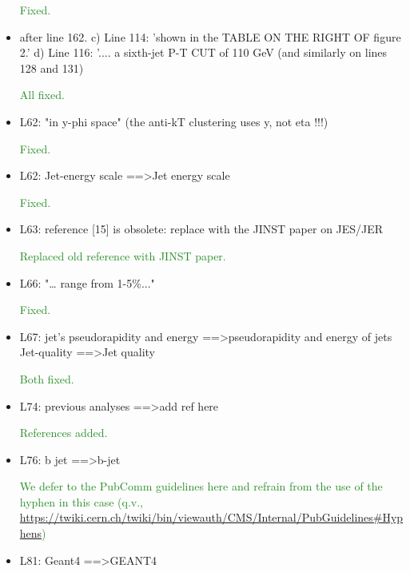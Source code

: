\documentclass[paper=a4, fontsize=11pt]{scrartcl}
\begin{document}
\begin{itemize}
\textcolor{ForestGreen}{Fixed.}\\


\item after line 162. 
c) Line 114: 'shown in the TABLE ON THE RIGHT OF figure 2.' 
d) Line 116: '.... a sixth-jet P-T CUT of 110 GeV 
(and similarly on lines 128 and 131) 

\textcolor{ForestGreen}{All fixed.}\\


\item L62: 
"in y-phi space" (the anti-kT clustering uses y, not eta !!!) 

\textcolor{ForestGreen}{Fixed.}\\


\item L62: 
Jet-energy scale ==\textgreater Jet energy scale 

\textcolor{ForestGreen}{Fixed.}\\


\item L63: 
reference [15] is obsolete: replace with the JINST paper on JES/JER 

\textcolor{ForestGreen}{Replaced old reference with JINST paper.}\\


\item L66: 
"… range from 1-5\%..." 

\textcolor{ForestGreen}{Fixed.}\\


\item L67: 
jet’s pseudorapidity and energy ==\textgreater pseudorapidity and energy of jets 
Jet-quality ==\textgreater Jet quality 

\textcolor{ForestGreen}{Both fixed.}\\


\item L74: 
previous analyses ==\textgreater add ref here 

\textcolor{ForestGreen}{References added.}\\


\item L76: 
b jet ==\textgreater b-jet 

\textcolor{ForestGreen}{We defer to the PubComm guidelines here and refrain from the use of the hyphen
in this case (q.v., \url{https://twiki.cern.ch/twiki/bin/viewauth/CMS/Internal/PubGuidelines\#Hyphens})}\\


\item L81: 
Geant4 ==\textgreater GEANT4 


\end{itemize}
\end{document}

